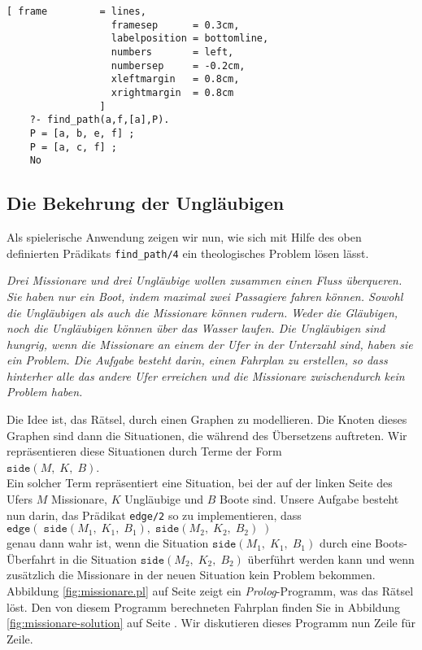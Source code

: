 \begin{Verbatim}[ frame         = lines, 
                  framesep      = 0.3cm, 
                  labelposition = bottomline,
                  numbers       = left,
                  numbersep     = -0.2cm,
                  xleftmargin   = 0.8cm,
                  xrightmargin  = 0.8cm
                ]
    ?- find_path(a,f,[a],P).
    P = [a, b, e, f] ;
    P = [a, c, f] ;    
    No
\end{Verbatim}


\subsection{Die Bekehrung der Ungläubigen}
Als spielerische Anwendung zeigen wir nun, wie sich mit Hilfe des oben definierten Prädikats 
\texttt{find\_path/4} ein theologisches Problem lösen lässt.
\vspace*{0.3cm}

\begin{minipage}[c]{14cm}
{\sl Drei Missionare und drei Ungläubige wollen zusammen einen Fluss 
überqueren. Sie haben nur ein Boot, indem maximal zwei Passagiere fahren können.  
Sowohl die Ungläubigen als auch die Missionare können rudern.
Weder die Gläubigen, noch die Ungläubigen können über das Wasser laufen.
Die Ungläubigen sind hungrig, wenn die Missionare an einem der Ufer in der Unterzahl sind, 
haben sie ein Problem.  Die Aufgabe besteht darin, einen Fahrplan zu 
erstellen, so dass hinterher alle das andere  Ufer erreichen und die
Missionare zwischendurch kein Problem haben.}
\end{minipage}
\vspace*{0.4cm}

\noindent
Die Idee ist, das Rätsel, durch einen Graphen zu modellieren.  Die Knoten dieses 
Graphen sind dann die Situationen, die während des Übersetzens auftreten.  Wir
repräsentieren diese Situationen durch Terme der Form \\[0.1cm]
\hspace*{1.3cm} $\texttt{side}(M,\;K,\;B)$.
\\[0.1cm]
Ein solcher Term repräsentiert eine Situation, bei der auf der linken Seite des Ufers $M$ Missionare, $K$
Ungläubige und $B$ Boote sind.  Unsere Aufgabe besteht nun darin, das Prädikat
\texttt{edge/2} so zu implementieren, dass \\[0.1cm]
\hspace*{1.3cm} $\texttt{edge}(\;\texttt{side}(M_1,\;K_1,\;B_1),\;\texttt{side}(M_2,\;K_2,\;B_2)\;)$
\\[0.1cm]
genau dann wahr ist, wenn die Situation $\texttt{side}(M_1,\;K_1,\;B_1)$
durch eine Boots-Überfahrt in die Situation $\texttt{side}(M_2,\;K_2,\;B_2)$ überführt
werden kann und wenn zusätzlich die Missionare in der neuen Situation kein Problem bekommen.
Abbildung \ref{fig:missionare.pl} auf Seite \pageref{fig:missionare.pl}
zeigt ein \textsl{Prolog}-Programm, was das Rätsel löst.  Den von diesem Programm
berechneten Fahrplan finden Sie in Abbildung \ref{fig:missionare-solution} 
auf Seite \pageref{fig:missionare-solution}.
Wir diskutieren dieses Programm nun Zeile für Zeile.

